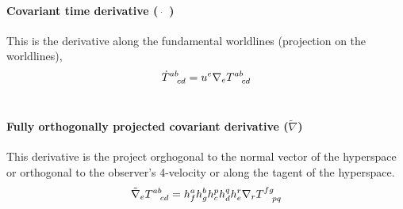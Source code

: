\documentclass[letterpaper,10pt,english]{sphinxmanual}
\begin{document}
{\paragraph{Covariant time derivative ($\dot \quad$)}
\label{GeneralRelativity:covariant-time-derivative}
This is the derivative along the fundamental worldlines (projection on the worldlines),
\begin{gather}
\begin{split}\begin{equation}
\dot T^{ab}_{\phantom{ab}cd} = u^e \nabla_e T^{ab}_{\phantom{ab}cd}
\end{equation}\end{split}\notag\\\begin{split}\end{split}\notag
\end{gather}

\paragraph{Fully orthogonally projected covariant derivative ($\tilde \nabla$)}
\label{GeneralRelativity:fully-orthogonally-projected-covariant-derivative}
This derivative is the project orghogonal to the normal vector of the hyperspace or orthogonal to the observer's 4-velocity or along the tagent of the hyperspace.
\begin{gather}
\begin{split}\begin{equation}
     \tilde\nabla_e T^{ab}_{\phantom{ab}cd} = h^a_f h^b_gh^p_ch^q_dh^r_e \nabla_r T^{fg}_{\phantom{fg}pq}
\end{equation}\end{split}\notag\\\begin{split}\end{split}\notag
\end{gather}

}
\end{document}
